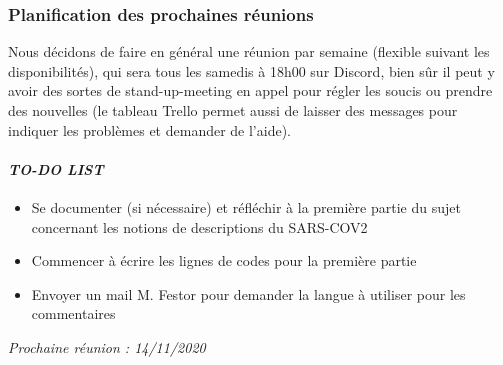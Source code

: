 \subsubsection*{Planification des prochaines réunions}
Nous décidons de faire en général une réunion par semaine (flexible suivant les disponibilités), qui sera tous les samedis à 18h00 sur Discord, bien sûr il peut y avoir des sortes de stand-up-meeting en appel pour régler les soucis ou prendre des nouvelles (le tableau Trello permet aussi de laisser des messages pour indiquer les problèmes et demander de l'aide).

\paragraph{\emph{TO-DO LIST}}
\begin{itemize}
    \item Se documenter (si nécessaire) et réfléchir à la première partie du sujet concernant les notions de descriptions du SARS-COV2
    \item Commencer à écrire les lignes de codes pour la première partie
    \item Envoyer un mail M. Festor pour demander la langue à utiliser pour les commentaires
\end{itemize}

\emph{Prochaine réunion : 14/11/2020}\\

% 